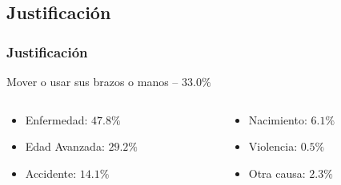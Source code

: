 \subsection{Justificaci\'on}
\begin{frame}
\frametitle{Justificaci\'on}

\begin{table}
\caption{Poblaci\'on con discapacidad en M\'exico, seg\'un distintas fuentes
 \cite{Milosavljevic2014,INEGI2014}}
\label{PoblacionDis}
\end{table}


\begin{block}{Mover o usar sus brazos o manos -- $33.0\%$}
\begin{columns}[T]%
\begin{column}{.5\textwidth}
\begin{itemize}
\item {Enfermedad: $47.8\%$}
\item {Edad Avanzada: $29.2\%$}
\item {Accidente: $14.1\%$}
\end{itemize}
\end{column}
\begin{column}{.5\textwidth}
\begin{itemize}
\item {Nacimiento: $6.1\%$}
\item {Violencia: $0.5\%$}
\item {Otra causa: $2.3\%$}
\end{itemize}
\end{column}
\end{columns}
\end{block}

\end{frame}

